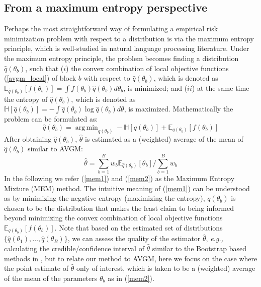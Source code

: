 \documentclass{article}
\DeclareMathOperator*{\argmin}{arg\,min}
\newcommand{\eg}[0]{\emph{e.g., }}
\newcommand{\1}[0]{\ensuremath{\boldsymbol{1}}\xspace}
\begin{document}
\subsection{From a maximum entropy perspective}\label{MEM}
Perhaps the most straightforward way of formulating a empirical risk minimization problem with respect to a distribution is via the maximum entropy principle, which is well-studied in natural language processing literature. Under the maximum entropy principle, the problem becomes finding a distribution $\hat q(\theta_b)$, such that ($i$) the convex combination of local objective functions (\ref{avgm_local}) of block $b$ with respect to $\hat q(\theta_b)$, which is denoted as $\mathbb{E}_{\hat q(\theta_b)}[f(\theta_b)] = \int f(\theta_b)\hat q(\theta_b) d\theta_b$, is minimized; and ($ii$) at the same time the entropy of $\hat q(\theta_b)$, which is denoted as $\mathbb{H}[\hat q(\theta_b)] = -\int \hat q(\theta_b)\log  \hat q(\theta_b) d\theta$, is maximized. Mathematically the problem can be formulated as:
\begin{equation}\label{mem1}
\textstyle\hat q(\theta_b) =\argmin_{q(\theta_b)} -\mathbb{H}[q(\theta_b)] +  \mathbb{E}_{q(\theta_b) }[f(\theta_b)]
\end{equation}
After obtaining $\hat q(\theta_b)$, $\hat\theta$ is estimated as a (weighted) average of the mean of $\hat q(\theta_b)$ similar to AVGM: 
\begin{equation}\label{mem2}
\hat\theta = \textstyle\sum_{b=1}^Bw_b\mathbb{E}_{\hat q(\theta_b) }[\theta_b]/\sum_{b=1}^Bw_b
\end{equation}
In the following we refer (\ref{mem1}) and (\ref{mem2}) as the Maximum Entropy Mixture (MEM) method. The intuitive meaning of (\ref{mem1}) can be understood as by minimizing the negative entropy (maximizing the entropy), $q(\theta_b)$ is chosen to be the distribution that makes the least claim to being informed beyond minimizing the convex combination of local objective functions $\mathbb{E}_{q(\theta_b) }[f(\theta_b)]$. Note that based on the estimated set of distributions $\{\hat q(\theta_1), \ldots, \hat q(\theta_B)\}$, we can assess the quality of the estimator $\hat\theta$, \eg calculating the credible/confidence interval of $\hat\theta$ similar to the Bootstrap based methods in \cite{Kleiner2012}, but to relate our method to AVGM, here we focus on the case where the point estimate of $\hat\theta$ only of interest, which is taken to be a (weighted) average of the mean of the parameters $\theta_b$ as in (\ref{mem2}).
\end{document}
